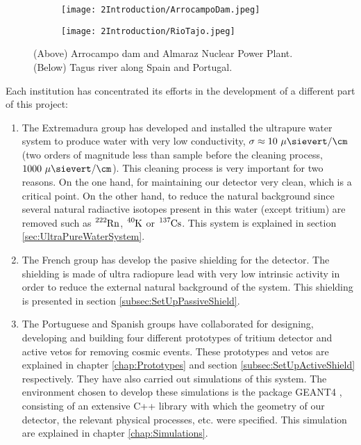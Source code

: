 \begin{figure}
\centering
    \begin{subfigure}[b]{0.45\textwidth}
    \centering
    \texttt{[image: 2Introduction/ArrocampoDam.jpeg]}  
    \caption{\label{subfig:Arrocampo_Dam}}
    \end{subfigure}
    \hfill
    \begin{subfigure}[b]{0.45\textwidth}
    \centering
    \texttt{[image: 2Introduction/RioTajo.jpeg]}  
    \caption{\label{subfig:TajusRiver}}
    \end{subfigure}
 \caption{(Above) Arrocampo dam and Almaraz Nuclear Power Plant. (Below) Tagus river along Spain and Portugal.}
 \label{fig:Arrocampo}
\end{figure}

Each institution has concentrated its efforts in the development of a different part of this project:

\begin{enumerate}
\item{} The Extremadura group has developed and installed the ultrapure water system to produce water with very low conductivity, $\sigma \approx 10~\mu\sievert/\cm$ (two orders of magnitude less than sample before the cleaning process, $1000~\mu\sievert/\cm$). This cleaning process is very important for two reasons. On the one hand, for maintaining our detector very clean, which is a critical point. On the other hand, to reduce the natural background since several natural radiactive isotopes present in this water (except tritium) are removed such as $\ce{^{222}Rn}$, $\ce{^{40}K}$ or $\ce{^{137}Cs}$. This system is explained in section \ref{sec:UltraPureWaterSystem}.

\item{} The French group has develop the pasive shielding for the detector. The shielding is made of ultra radiopure lead with very low intrinsic activity in order to reduce the external natural background of the system. This shielding is presented in section \ref{subsec:SetUpPassiveShield}.

\item{} The Portuguese and Spanish groups have collaborated for designing, developing and building four different prototypes of tritium detector and active vetos for removing cosmic events. These prototypes and vetos are explained in chapter \ref{chap:Prototypes} and section \ref{subsec:SetUpActiveShield} respectively. They have also carried out simulations of this system. The environment chosen to develop these simulations is the package GEANT4 \cite{Geant4WebPage}, consisting of an extensive C++ library with which the geometry of our detector, the relevant physical processes, etc. were specified. This simulation are explained in chapter \ref{chap:Simulations}.

\end{enumerate}

